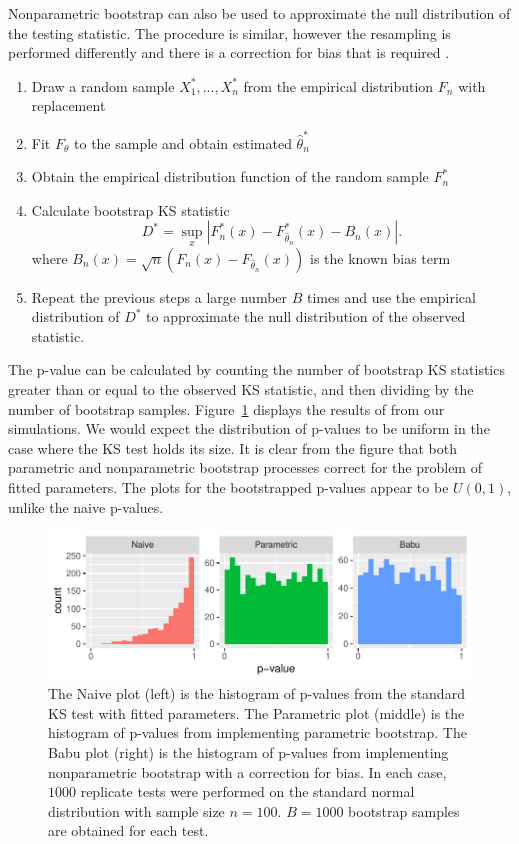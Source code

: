 \documentclass[12pt, letterpaper, titlepage]{article}
\begin{document}
Nonparametric bootstrap can also be used to approximate the null distribution 
of the testing statistic. The procedure is similar, however the resampling is 
performed differently and there is a correction for bias that is required 
\citep{Babu}.
\begin{enumerate}
  \item 
    Draw a random sample $X_1^*,...,X_n^*$ from the empirical distribution $F_n$
    with replacement
  \item 
    Fit $F_\theta$ to the sample and obtain estimated $\hat\theta_n^*$
  \item
    Obtain the empirical distribution function of the random sample $F_n^*$
  \item 
    Calculate bootstrap KS statistic
    \[
      D^* = \sup_x | F_n^* (x)- F_{\hat\theta_n}^*(x) - B_n(x) |.
    \]
    where $B_{n}(x) = \sqrt{n}(F_{n}(x) - F_{\hat\theta_n}(x))$ is the known 
    bias term \citep{Babu}
  \item
    Repeat the previous steps a large number $B$ times and use the empirical 
    distribution of $D^*$ to approximate the null distribution of the observed 
    statistic.
\end{enumerate}
The p-value can be calculated by counting the number of bootstrap KS 
statistics greater than or equal to the observed KS statistic, and then dividing 
by the number of bootstrap samples. Figure~\ref{fig:hist_fitted} displays the 
results of from our simulations. We would expect the distribution of p-values 
to be uniform in the case where the KS test holds its size. It is clear from the 
figure that both parametric and nonparametric bootstrap processes correct for 
the problem of fitted parameters. The plots for the bootstrapped p-values appear
to be $U(0,1)$, unlike the naive p-values.

\begin{figure}[tbp]
  \centering
  \includegraphics[width=\textwidth]{hist_fitted}
  \caption{The Naive plot (left) is the histogram of p-values from the standard 
  KS test with fitted parameters. The Parametric plot (middle) is the histogram
  of p-values from implementing parametric bootstrap. The Babu plot (right) is 
  the histogram of p-values from implementing nonparametric bootstrap with a 
  correction for bias. In each case, $1000$ replicate tests were performed on 
  the standard normal distribution with sample size $n = 100$. $B = 1000$ 
  bootstrap samples are obtained for each test.}
  \label{fig:hist_fitted}
\end{figure}
\end{document}
